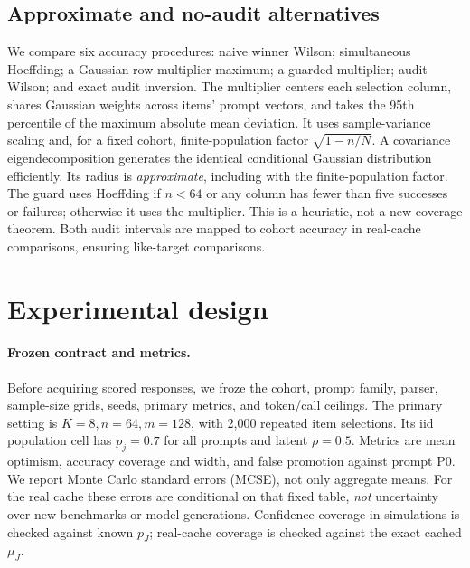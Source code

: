 \documentclass{article}
\begin{document}
\subsection{Approximate and no-audit alternatives}
We compare six accuracy procedures: naive winner Wilson; simultaneous Hoeffding; a Gaussian row-multiplier maximum; a guarded multiplier; audit Wilson; and exact audit inversion. The multiplier centers each selection column, shares Gaussian weights across items' prompt vectors, and takes the 95th percentile of the maximum absolute mean deviation. It uses sample-variance scaling and, for a fixed cohort, finite-population factor $\sqrt{1-n/N}$. A covariance eigendecomposition generates the identical conditional Gaussian distribution efficiently. Its radius is \emph{approximate}, including with the finite-population factor. The guard uses Hoeffding if $n<64$ or any column has fewer than five successes or failures; otherwise it uses the multiplier. This is a heuristic, not a new coverage theorem. Both audit intervals are mapped to cohort accuracy in real-cache comparisons, ensuring like-target comparisons.

\section{Experimental design}
\paragraph{Frozen contract and metrics.}
Before acquiring scored responses, we froze the cohort, prompt family, parser, sample-size grids, seeds, primary metrics, and token/call ceilings. The primary setting is $K=8,n=64,m=128$, with 2,000 repeated item selections. Its iid population cell has $p_j=0.7$ for all prompts and latent $\rho=0.5$. Metrics are mean optimism, accuracy coverage and width, and false promotion against prompt P0. We report Monte Carlo standard errors (MCSE), not only aggregate means. For the real cache these errors are conditional on that fixed table, \emph{not} uncertainty over new benchmarks or model generations. Confidence coverage in simulations is checked against known $p_J$; real-cache coverage is checked against the exact cached $\mu_J$.
\end{document}
